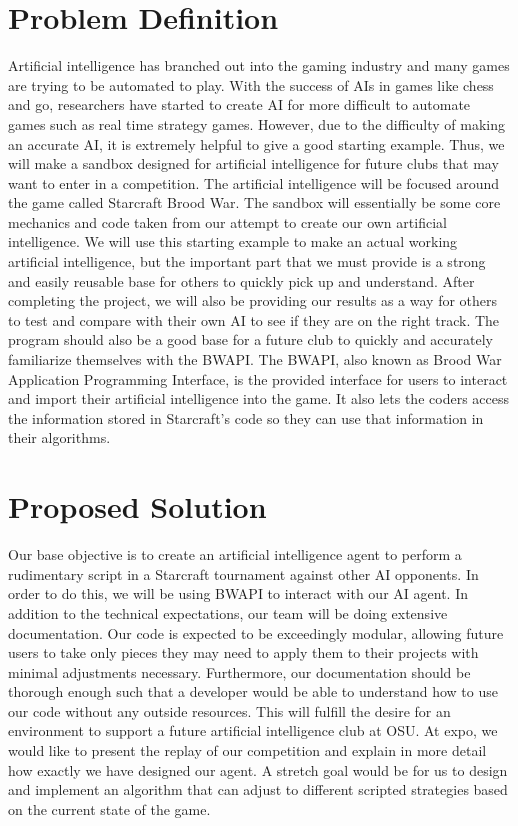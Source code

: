 \documentclass[10pt,letterpaper,onecolumn,draftclsnofoot]{IEEEtran}
\begin{document}
\section{Problem Definition}
Artificial intelligence has branched out into the gaming industry and many games are trying to be automated to play. With the success of AIs in games like chess and go, researchers have started to create AI for more difficult to automate games such as real time strategy games. However, due to the difficulty of making an accurate AI, it is extremely helpful to give a good starting example. Thus, we will make a sandbox designed for artificial intelligence for future clubs that may want to enter in a competition. The artificial intelligence will be focused around the game called Starcraft Brood War. The sandbox will essentially be some core mechanics and code taken from our attempt to create our own artificial intelligence. We will use this starting example to make an actual working artificial intelligence, but the important part that we must provide is a strong and easily reusable base for others to quickly pick up and understand. After completing the project, we will also be providing our results as a way for others to test and compare with their own AI to see if they are on the right track. The program should also be a good base for a future club to quickly and accurately familiarize themselves with the BWAPI. The BWAPI, also known as Brood War Application Programming Interface, is the provided interface for users to interact and import their artificial intelligence into the game. It also lets the coders access the information stored in Starcraft's code so they can use that information in their algorithms.

\section{Proposed Solution}
Our base objective is to create an artificial intelligence agent to perform a rudimentary script in a Starcraft tournament against other AI opponents. In order to do this, we will be using BWAPI to interact with our AI agent. In addition to the technical expectations, our team will be doing extensive documentation. Our code is expected to be exceedingly modular, allowing future users to take only pieces they may need to apply them to their projects with minimal adjustments necessary. Furthermore, our documentation should be thorough enough such that a developer would be able to understand how to use our code without any outside resources. This will fulfill the desire for an environment to support a future artificial intelligence club at OSU. At expo, we would like to present the replay of our competition and explain in more detail how exactly we have designed our agent. A stretch goal would be for us to design and implement an algorithm that can adjust to different scripted strategies based on the current state of the game. 
\end{document}
